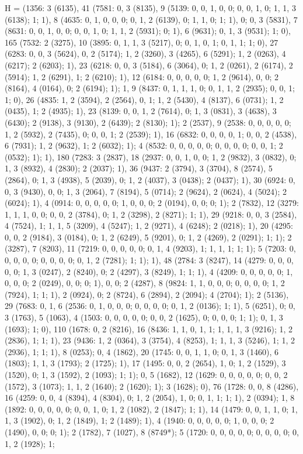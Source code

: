 {H = (1356: 3 (6135), 41 (7581: 0, 3 (8135), 9 (5139: 0, 0, 1, 0, 0; 0, 0, 1, 0; 1, 1, 3 (6138); 1; 1), 8 (4635: 0, 1, 0, 0, 0; 0, 1, 2 (6139), 0; 1, 1, 0; 1; 1), 0; 0, 3 (5831), 7 (8631: 0, 0, 1, 0, 0; 0, 0, 1, 0; 1, 1, 2 (5931); 0; 1), 6 (9631); 0, 1, 3 (9531); 1; 0), 165 (7532: 2 (3275), 10 (3895: 0, 1, 1, 3 (5217), 0; 0, 1, 0, 1; 0, 1, 1; 1; 0), 27 (6283: 0, 0, 3 (5624), 0, 2 (5174); 1, 2 (3260), 3 (4265), 6 (5291); 1, 2 (0263), 4 (6217); 2 (6203); 1), 23 (6218: 0, 0, 3 (5184), 6 (3064), 0; 1, 2 (0261), 2 (6174), 2 (5914); 1, 2 (6291), 1; 2 (6210); 1), 12 (6184: 0, 0, 0, 0, 0; 1, 2 (9614), 0, 0; 2 (8164), 4 (0164), 0; 2 (6194); 1); 1, 9 (8437: 0, 1, 1, 1, 0; 0, 1, 1, 2 (2935); 0, 0, 1; 1; 0), 26 (4835: 1, 2 (3594), 2 (2564), 0, 1; 1, 2 (5430), 4 (8137), 6 (0731); 1, 2 (0435), 1; 2 (4935); 1), 23 (8139: 0, 0, 1, 2 (7614), 0; 1, 3 (0831), 3 (4638), 3 (6430); 2 (9138), 3 (9130), 2 (6439); 2 (8130); 1); 2 (2537), 9 (2538: 0, 0, 0, 0, 0; 1, 2 (5932), 2 (7435), 0; 0, 0, 1; 2 (2539); 1), 16 (6832: 0, 0, 0, 0, 1; 0, 0, 2 (4538), 6 (7931); 1, 2 (9632), 1; 2 (6032); 1); 4 (8532: 0, 0, 0, 0, 0; 0, 0, 0, 0; 0, 0, 1; 2 (0532); 1); 1), 180 (7283: 3 (2837), 18 (2937: 0, 0, 1, 0, 0; 1, 2 (9832), 3 (0832), 0; 1, 3 (8932), 4 (2830); 2 (2037); 1), 36 (9437: 2 (3794), 3 (3704), 8 (2574), 5 (2864), 0; 1, 3 (4938), 5 (2039), 0; 1, 2 (4037), 3 (0438); 2 (0437); 1), 30 (6924: 0, 0, 3 (9430), 0, 0; 1, 3 (2064), 7 (8194), 5 (0714); 2 (9624), 2 (0624), 4 (5024); 2 (6024); 1), 4 (0914: 0, 0, 0, 0, 0; 1, 0, 0, 0; 2 (0194), 0, 0; 0; 1); 2 (7832), 12 (3279: 1, 1, 1, 0, 0; 0, 0, 2 (3784), 0; 1, 2 (3298), 2 (8271); 1; 1), 29 (9218: 0, 0, 3 (2584), 4 (7524), 1; 1, 1, 5 (3209), 4 (5247); 1, 2 (9271), 4 (6248); 2 (0218); 1), 20 (4295: 0, 0, 2 (9184), 3 (0184), 0; 1, 2 (6249), 5 (9201), 0; 1, 2 (4269), 2 (0291); 1; 1); 2 (3287), 7 (8203), 11 (7219: 0, 0, 0, 0, 0; 0, 1, 4 (9203), 1; 1, 1, 1; 1; 1); 5 (7203: 0, 0, 0, 0, 0; 0, 0, 0, 0; 0, 1, 2 (7281); 1; 1); 1), 48 (2784: 3 (8247), 14 (4279: 0, 0, 0, 0, 0; 1, 3 (0247), 2 (8240), 0; 2 (4297), 3 (8249), 1; 1; 1), 4 (4209: 0, 0, 0, 0, 0; 1, 0, 0, 0; 2 (0249), 0, 0; 0; 1), 0, 0; 2 (4287), 8 (9824: 1, 1, 0, 0, 0; 0, 0, 0, 0; 1, 2 (7924), 1; 1; 1), 2 (0924), 0; 2 (8724), 6 (2894), 2 (2094); 4 (2704); 1); 2 (5136), 29 (7683: 0, 1, 6 (2536: 0, 1, 0, 0, 0; 0, 0, 0, 0; 0, 1, 2 (0136); 1; 1), 5 (6251), 0; 0, 3 (1763), 5 (1063), 4 (1503: 0, 0, 0, 0, 0; 0, 0, 2 (1625), 0; 0, 0, 0; 1; 1); 0, 1, 3 (1693); 1; 0), 110 (1678: 0, 2 (8216), 16 (8436: 1, 1, 0, 1, 1; 1, 1, 1, 3 (9216); 1, 2 (2836), 1; 1; 1), 23 (9436: 1, 2 (0364), 3 (3754), 4 (8253), 1; 1, 1, 3 (5246), 1; 1, 2 (2936), 1; 1; 1), 8 (0253); 0, 4 (1862), 20 (1745: 0, 0, 1, 1, 0; 0, 1, 3 (1460), 6 (1803); 1, 1, 3 (1793); 2 (1725); 1), 17 (1495: 0, 0, 2 (2654), 1, 0; 1, 2 (1529), 3 (1520), 0; 1, 3 (1592), 2 (1093); 1; 1); 0, 5 (1682), 12 (1629: 0, 0, 0, 0, 0; 0, 0, 2 (1572), 3 (1073); 1, 1, 2 (1640); 2 (1620); 1); 3 (1628); 0), 76 (1728: 0, 0, 8 (4286), 16 (4259: 0, 0, 4 (8394), 4 (8304), 0; 1, 2 (2054), 1, 0; 0, 1, 1; 1; 1), 2 (0394); 1, 8 (1892: 0, 0, 0, 0, 0; 0, 0, 1, 0; 1, 2 (1082), 2 (1847); 1; 1), 14 (1479: 0, 0, 1, 1, 0; 1, 1, 3 (1902), 0; 1, 2 (1849), 1; 2 (1489); 1), 4 (1940: 0, 0, 0, 0, 0; 1, 0, 0, 0; 2 (1490), 0, 0; 0; 1); 2 (1782), 7 (1027), 8 (8749*); 5 (1720: 0, 0, 0, 0, 0; 0, 0, 0, 0; 0, 1, 2 (1928); 1; }
